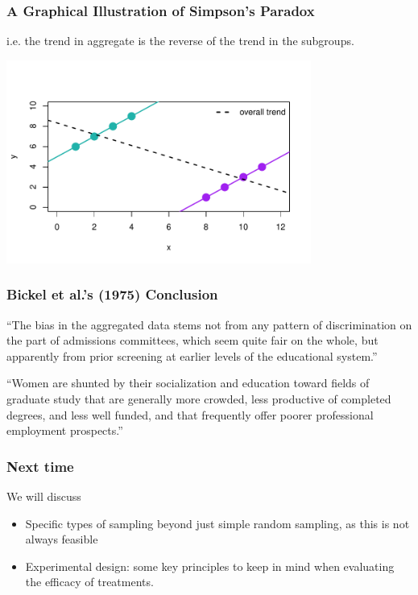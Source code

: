 \documentclass[slides]{beamer}\usepackage[]{graphicx}\usepackage[]{color}
\newcommand{\blue}[1]{\textcolor{blue2}{#1}}
\begin{document}
\begin{frame}
\frametitle{A Graphical Illustration of Simpson's Paradox}
i.e. the trend in aggregate is the \blue{reverse} of the trend in the subgroups.
\begin{center}
\includegraphics[width=10cm]{simpsons5.pdf}
\end{center}

\end{frame}



\begin{frame}
\frametitle{Bickel et al.'s (1975) Conclusion}

\pause ``The bias in the aggregated data stems \blue{not from any pattern of discrimination on the part of admissions committees}, which seem quite fair on the whole, but apparently from \blue{prior screening at earlier levels of the educational system}.''

\vspace{0.5cm}

\pause ``Women are shunted by their socialization and education toward fields of graduate study that are generally more crowded, less productive of completed degrees, and less well funded, and that frequently offer poorer professional employment prospects.''

\end{frame}



\begin{frame}
\frametitle{Next time}

We will discuss 
\begin{itemize}
\item Specific types of sampling beyond just \blue{simple random sampling}, as this is not always feasible
\pause\item Experimental design:  some key principles to keep in mind when evaluating the efficacy of treatments. 
\end{itemize}

\end{frame}
\end{document}
